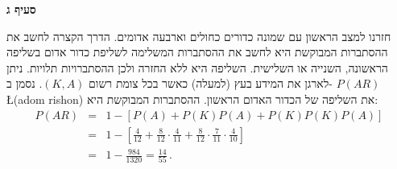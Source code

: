 \textbf{סעיף ג}

חזרנו למצב הראשון עם שמונה כדורים כחולים וארבעה אדומים. הדרך הקצרה לחשב את ההסתברות המבוקשת היא לחשב את ההסתברות המשלימה לשליפת כדור אדום בשליפה הראשונה, השנייה או השלישית. השליפה היא ללא החזרה ולכן ההסתברויות תלויות. ניתן לארגן את המידע בעץ (למעלה) כאשר בכל צומת רשום
$(K,A)$.
נסמן ב-%
$P(AR)$ \L{(adom rishon)}
את השליפה של הכדור האדום הראשון. ההסתברות המבוקשת היא:
\begin{eqnarray*}
P(AR) &=& 1-\left[P(A) + P(K)P(A) + P(K)P(K)P(A)\right]\\[6pt]
&=& 1-\left[\frac{4}{12} + \frac{8}{12}\cdot\frac{4}{11} +
   \frac{8}{12}\cdot\frac{7}{11}\cdot\frac{4}{10}\right]\\[6pt]
&=&1-\frac{984}{1320}=\frac{14}{55}\,.
\end{eqnarray*}
